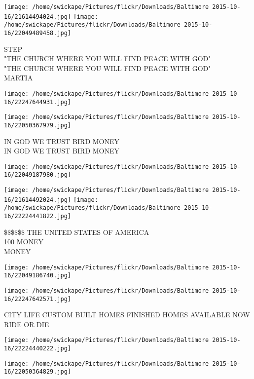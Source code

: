 \documentclass[10pt,letterpaper]{article}
\begin{document}
\texttt{[image: /home/swickape/Pictures/flickr/Downloads/Baltimore 2015-10-16/21614494024.jpg]}
\texttt{[image: /home/swickape/Pictures/flickr/Downloads/Baltimore 2015-10-16/22049489458.jpg]}

STEP\\
"THE CHURCH WHERE YOU WILL FIND PEACE WITH GOD"\\
"THE CHURCH WHERE YOU WILL FIND PEACE WITH GOD"\\
MARTIA\\
\pagebreak

\texttt{[image: /home/swickape/Pictures/flickr/Downloads/Baltimore 2015-10-16/22247644931.jpg]}

\vspace{0.25in}
\texttt{[image: /home/swickape/Pictures/flickr/Downloads/Baltimore 2015-10-16/22050367979.jpg]}

IN GOD WE TRUST BIRD MONEY\\
IN GOD WE TRUST BIRD MONEY\\
\pagebreak

\texttt{[image: /home/swickape/Pictures/flickr/Downloads/Baltimore 2015-10-16/22049187980.jpg]}

\vspace{0.25in}
\texttt{[image: /home/swickape/Pictures/flickr/Downloads/Baltimore 2015-10-16/21614492024.jpg]}
\texttt{[image: /home/swickape/Pictures/flickr/Downloads/Baltimore 2015-10-16/22224441822.jpg]}

\$\$\$\$\$\$ THE UNITED STATES OF AMERICA\\
100 MONEY\\
MONEY\\
\pagebreak

\texttt{[image: /home/swickape/Pictures/flickr/Downloads/Baltimore 2015-10-16/22049186740.jpg]}

\vspace{0.25in}
\texttt{[image: /home/swickape/Pictures/flickr/Downloads/Baltimore 2015-10-16/22247642571.jpg]}

CITY LIFE CUSTOM BUILT HOMES FINISHED HOMES AVAILABLE NOW\\
RIDE OR DIE\\
\pagebreak

\texttt{[image: /home/swickape/Pictures/flickr/Downloads/Baltimore 2015-10-16/22224440222.jpg]}

\vspace{0.25in}
\texttt{[image: /home/swickape/Pictures/flickr/Downloads/Baltimore 2015-10-16/22050364829.jpg]}
\end{document}
